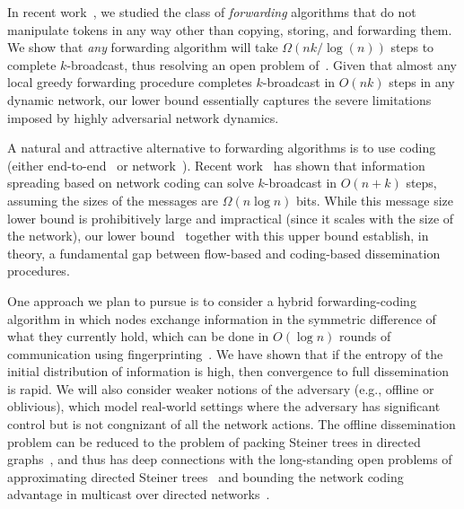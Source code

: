 
In recent work~\cite{dutta+prs:dynamic}, we studied the class of {\em
  forwarding}\/ algorithms that do not manipulate tokens in any way
other than copying, storing, and forwarding them.  We show that {\em
  any}\/ forwarding algorithm will take $\Omega(nk/\log(n))$ steps to
complete $k$-broadcast, thus resolving an open problem
of~\cite{kuhn+lo:dynamic}.  Given that almost any local greedy
forwarding procedure completes $k$-broadcast in $O(nk)$ steps in any
dynamic network, our lower bound essentially captures the severe
limitations imposed by highly adversarial network dynamics.

A natural and attractive alternative to forwarding algorithms is to
use coding (either end-to-end~\cite{Byers02adigital,Shok06} or
network~\cite{ahlswede+cly:coding}).  Recent
work~\cite{haeupler:gossip,haeupler+k:dynamic} has shown that
information spreading based on network coding can solve $k$-broadcast
in $O(n+k)$ steps, assuming the sizes of the messages are $\Omega(n
\log n)$ bits.  While this message size lower bound is prohibitively
large and impractical (since it scales with the size of the network),
our lower bound~\cite{dutta+prs:dynamic} together with this upper
bound establish, in theory, a fundamental gap between flow-based and
coding-based dissemination procedures.

One approach we plan to pursue is to consider a hybrid
forwarding-coding algorithm in which nodes exchange information in the
symmetric difference of what they currently hold, which can be done in
$O(\log n)$ rounds of communication using
fingerprinting~\cite{mitzenmacher-2005-fastmixing}.  We have shown
that if the entropy of the initial distribution of information
is high, then convergence to full dissemination is rapid.  We will
also consider weaker notions of the adversary (e.g., offline or
oblivious), which model real-world settings where the adversary has
significant control but is not congnizant of all the network actions.
The offline dissemination problem can be reduced to the problem of
packing Steiner trees in directed
graphs~\cite{cheriyan+s:steiner,dutta+prs:dynamic}, and thus has deep
connections with the long-standing open problems of approximating
directed Steiner
trees~\cite{charikar+ccdgg:steiner,halperin+k:steiner,zosin+k:steiner}
and bounding the network coding advantage in multicast over directed
networks~\cite{agarwal+c:coding,sanders+et:flow}.

